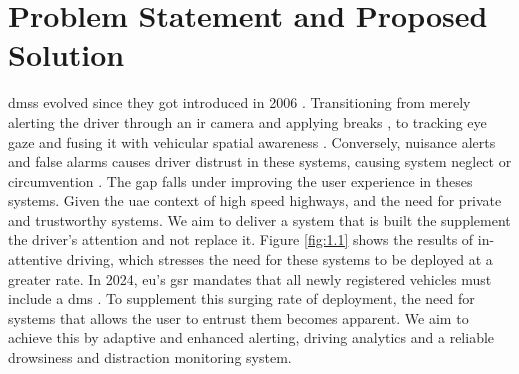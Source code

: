 \section{Problem Statement and Proposed Solution}

\glspl{dms} evolved since they got introduced in 2006 \cite{r7}. Transitioning from merely alerting the driver through an \gls{ir} camera and applying breaks \cite{r8}, to tracking eye gaze and fusing it with vehicular spatial awareness \cite{r9}. Conversely, nuisance alerts and false alarms causes driver distrust in these systems, causing system neglect or circumvention \cite{r10}. The gap falls under improving the user experience in theses systems. Given the \gls{uae} context of high speed highways, and the need for private and trustworthy systems. We aim to deliver a system that is built the supplement the driver's attention and not replace it. Figure \ref{fig:1.1} shows the results of in-attentive driving, which stresses the need for these systems to be deployed at a greater rate. In 2024, \gls{eu}’s \gls{gsr} mandates that all newly registered vehicles must include a \gls{dms} \cite{r11}. To supplement this surging rate of deployment, the need for systems that allows the user to entrust them becomes apparent.  We aim to achieve this by adaptive and enhanced alerting, driving analytics and a reliable drowsiness and distraction monitoring system. 




